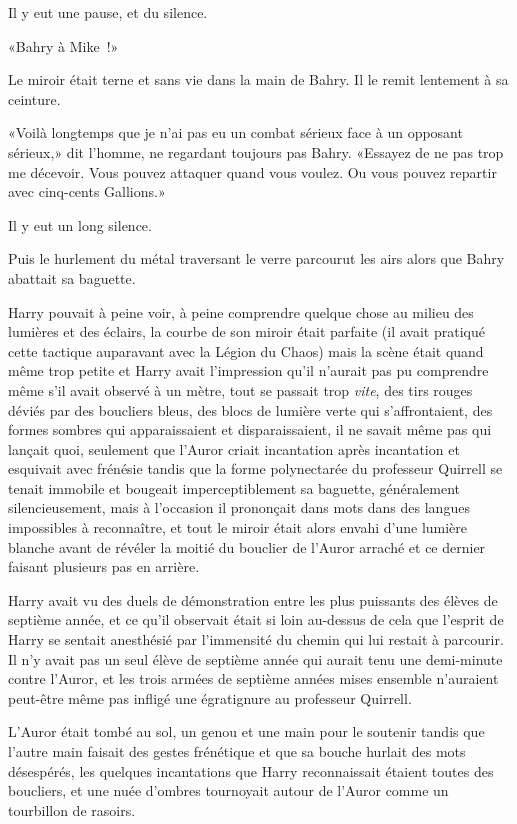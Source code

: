 Il y eut une pause, et du silence.

«Bahry à Mike~!»

Le miroir était terne et sans vie dans la main de Bahry. Il le remit lentement à sa ceinture.

«Voilà longtemps que je n'ai pas eu un combat sérieux face à un opposant sérieux,» dit l'homme, ne regardant toujours pas Bahry. «Essayez de ne pas trop me décevoir. Vous pouvez attaquer quand vous voulez. Ou vous pouvez repartir avec cinq-cents Gallions.»

Il y eut un long silence.

Puis le hurlement du métal traversant le verre parcourut les airs alors que Bahry abattait sa baguette.

\later

Harry pouvait à peine voir, à peine comprendre quelque chose au milieu des lumières et des éclairs, la courbe de son miroir était parfaite (il avait pratiqué cette tactique auparavant avec la Légion du Chaos) mais la scène était quand même trop petite et Harry avait l'impression qu'il n'aurait pas pu comprendre même s'il avait observé à un mètre, tout se passait trop \emph{vite}, des tirs rouges déviés par des boucliers bleus, des blocs de lumière verte qui s'affrontaient, des formes sombres qui apparaissaient et disparaissaient, il ne savait même pas qui lançait quoi, seulement que l'Auror criait incantation après incantation et esquivait avec frénésie tandis que la forme polynectarée du professeur Quirrell se tenait immobile et bougeait imperceptiblement sa baguette, généralement silencieusement, mais à l'occasion il prononçait dans mots dans des langues impossibles à reconnaître, et tout le miroir était alors envahi d'une lumière blanche avant de révéler la moitié du bouclier de l'Auror arraché et ce dernier faisant plusieurs pas en arrière.

Harry avait vu des duels de démonstration entre les plus puissants des élèves de septième année, et ce qu'il observait était si loin au-dessus de cela que l'esprit de Harry se sentait anesthésié par l'immensité du chemin qui lui restait à parcourir. Il n'y avait pas un seul élève de septième année qui aurait tenu une demi-minute contre l'Auror, et les trois armées de septième années mises ensemble n'auraient peut-être même pas infligé une égratignure au professeur Quirrell.

L'Auror était tombé au sol, un genou et une main pour le soutenir tandis que l'autre main faisait des gestes frénétique et que sa bouche hurlait des mots désespérés, les quelques incantations que Harry reconnaissait étaient toutes des boucliers, et une nuée d'ombres tournoyait autour de l'Auror comme un tourbillon de rasoirs.


